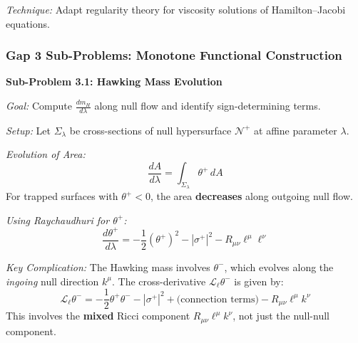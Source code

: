 \textit{Technique:} Adapt regularity theory for viscosity solutions of Hamilton--Jacobi equations.

\subsubsection{Gap 3 Sub-Problems: Monotone Functional Construction}

\begin{center}
\end{center}

\textbf{Sub-Problem 3.1: Hawking Mass Evolution}

\textit{Goal:} Compute $\frac{dm_H}{d\lambda}$ along null flow and identify sign-determining terms.

\textit{Setup:} Let $\Sigma_\lambda$ be cross-sections of null hypersurface $\mathcal{N}^+$ at affine parameter $\lambda$.

\textit{Evolution of Area:}
\begin{equation}
    \frac{dA}{d\lambda} = \int_{\Sigma_\lambda} \theta^+ \, dA
\end{equation}
For trapped surfaces with $\theta^+ < 0$, the area \textbf{decreases} along outgoing null flow.

\textit{Using Raychaudhuri for $\theta^+$:}
\begin{equation}
    \frac{d\theta^+}{d\lambda} = -\frac{1}{2}(\theta^+)^2 - |\sigma^+|^2 - R_{\mu\nu}\ell^\mu\ell^\nu
\end{equation}

\textit{Key Complication:} The Hawking mass involves $\theta^-$, which evolves along the \textit{ingoing} null direction $k^\mu$. The cross-derivative $\mathcal{L}_\ell \theta^-$ is given by:
\begin{equation}
    \mathcal{L}_\ell \theta^- = -\frac{1}{2}\theta^+\theta^- - |\sigma^+|^2 + \text{(connection terms)} - R_{\mu\nu}\ell^\mu k^\nu
\end{equation}
This involves the \textbf{mixed} Ricci component $R_{\mu\nu}\ell^\mu k^\nu$, not just the null-null component.

